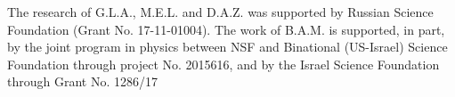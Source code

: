 \documentclass[aps,preprint,showkeys,
]{revtex4}
\begin{document}


\acknowledgements

The research of G.L.A., M.E.L. and D.A.Z. was supported by Russian Science
Foundation (Grant No. 17-11-01004). The work of B.A.M. is supported, in
part, by the joint program in physics between NSF and Binational (US-Israel)
Science Foundation through project No. 2015616, and by the Israel Science
Foundation through Grant No. 1286/17
\end{document}
